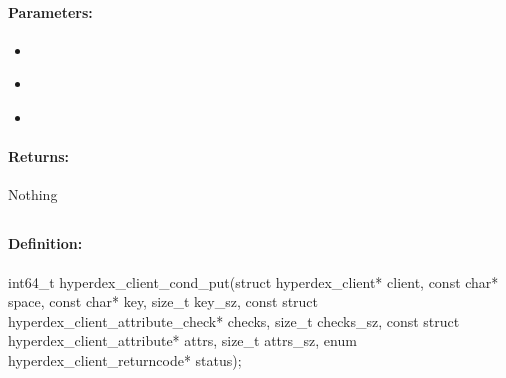 \paragraph{Parameters:}
\begin{itemize}[noitemsep]
\item {}\\

\item {}\\

\item {}\\

\end{itemize}

\paragraph{Returns:}
Nothing
\pagebreak
\subsection{}
\label{api:c:cond_put}


\paragraph{Definition:}
\begin{ccode}
int64_t hyperdex_client_cond_put(struct hyperdex_client* client,
        const char* space,
        const char* key, size_t key_sz,
        const struct hyperdex_client_attribute_check* checks, size_t checks_sz,
        const struct hyperdex_client_attribute* attrs, size_t attrs_sz,
        enum hyperdex_client_returncode* status);
\end{ccode}

